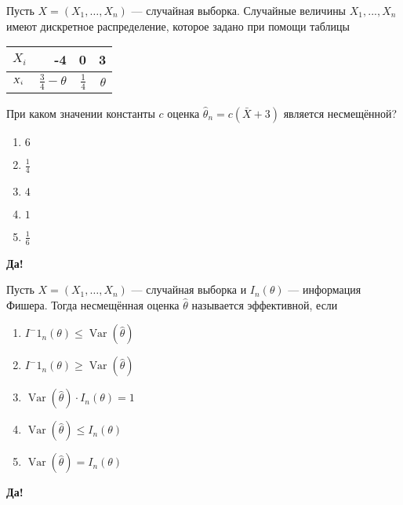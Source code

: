 \documentclass[t]{beamer}
\DeclareMathOperator{\Var}{Var}
\let\P\relax
\DeclareMathOperator{\P}{\mathbb{P}}
\begin{document}
 \begin{frame} \label{48-Yes} 
\begin{block}{48} 

Пусть $X = (X_1, \ldots , X_n)$ — случайная выборка. Случайные величины $X_1, ... , X_n$ имеют дискретное распределение, которое задано при помощи таблицы

\begin{center}
\begin{tabular}{lrrr} \toprule
$X_i$  & -4 & 0 & 3 \\
\midrule
$\P_{X_i}$ & $\frac{3}{4} - \theta$ & $\frac{1}{4}$ & $\theta$\\
\bottomrule
\end{tabular}
\end{center}

При каком значении константы $c$ оценка  $\hat{\theta}_n = c (\bar{X} + 3)$ является несмещённой?
  


 \end{block} 
\begin{enumerate} 
\item[] \hyperlink{48-No}{\beamergotobutton{} $6$}
\item[] \hyperlink{48-No}{\beamergotobutton{} $\frac{1}{4}$}
\item[] \hyperlink{48-No}{\beamergotobutton{} $4$}
\item[] \hyperlink{48-No}{\beamergotobutton{} $1$}
\item[] \hyperlink{48-Yes}{\beamergotobutton{} $\frac{1}{6}$}
\end{enumerate} 

 \textbf{Да!} 
 \hyperlink{49}{}\end{frame} 


 \begin{frame} \label{49-Yes} 
\begin{block}{49} 

Пусть $X = (X_1, \ldots , X_n)$ — случайная выборка и $I_n(\theta)$ — информация Фишера. Тогда несмещённая оценка $\hat{\theta}$ называется эффективной, если
  


 \end{block} 
\begin{enumerate} 
\item[] \hyperlink{49-No}{\beamergotobutton{} $I^-1_n (\theta) \leq \Var(\hat\theta)$}
\item[] \hyperlink{49-No}{\beamergotobutton{} $I^-1_n (\theta) \geq \Var(\hat\theta)$}
\item[] \hyperlink{49-Yes}{\beamergotobutton{} $\Var(\hat\theta) \cdot I_n (\theta) = 1$}
\item[] \hyperlink{49-No}{\beamergotobutton{} $\Var(\hat\theta) \leq I_n (\theta)$}
\item[] \hyperlink{49-No}{\beamergotobutton{} $\Var(\hat\theta) = I_n (\theta)$}
\end{enumerate} 

 \textbf{Да!} 
 \hyperlink{50}{}\end{frame} 
\end{document}
